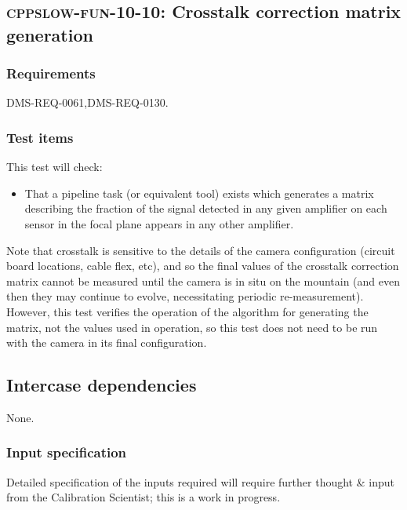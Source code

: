 \subsection{\textsc{cppslow-fun-10-10}: Crosstalk correction matrix generation}
\label{cppslow-fun-10-10}

\subsubsection{Requirements}

DMS-REQ-0061,DMS-REQ-0130.

\subsubsection{Test items}

This test will check:

\begin{itemize}

  \item{That a pipeline task (or equivalent tool) exists which generates a
  matrix describing the fraction of the signal detected in any given amplifier
  on each sensor in the focal plane appears in any other amplifier.}

\end{itemize}

Note that crosstalk is sensitive to the details of the camera configuration
(circuit board locations, cable flex, etc), and so the final values of the
crosstalk correction matrix cannot be measured until the camera is in situ on
the mountain (and even then they may continue to evolve, necessitating periodic
re-measurement). However, this test verifies the operation of the algorithm for
generating the matrix, not the values used in operation, so this test does not
need to be run with the camera in its final configuration.

\subsection{Intercase dependencies}

None.

\subsubsection{Input specification}

\begin{note}
Detailed specification of the inputs required will require further thought \&
input from the Calibration Scientist; this is a work in progress.
\end{note}


